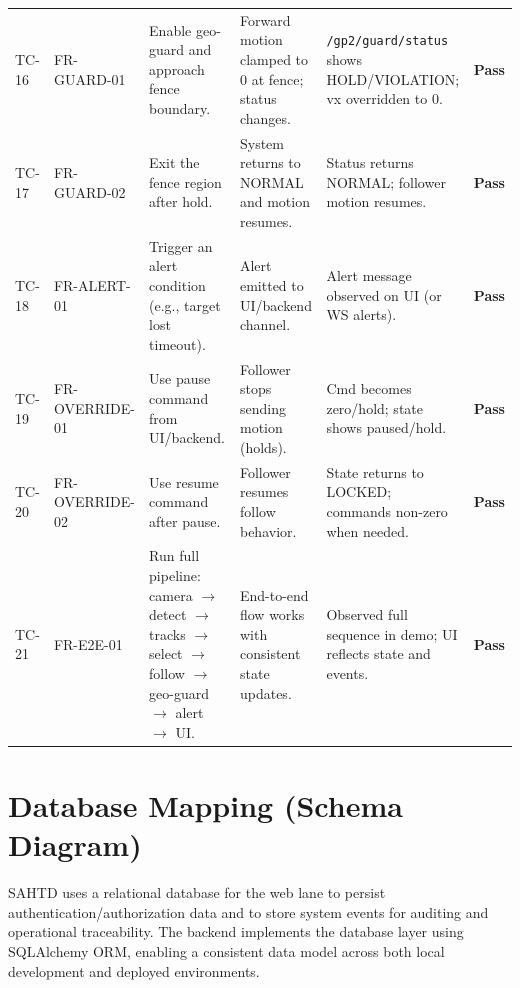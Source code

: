 \documentclass[12pt,a4paper]{report}
\newcommand{\statusPass}{\textcolor{green!45!black}{\textbf{Pass}}}
\begin{document}
\begin{landscape}
\begin{longtable}{@{}L{1.6cm} L{2.6cm} L{5.2cm} L{5.2cm} L{5.2cm} C{1.4cm}@{}}
TC-16 & FR-GUARD-01 &
Enable geo-guard and approach fence boundary. &
Forward motion clamped to 0 at fence; status changes. &
\texttt{/gp2/guard/status} shows HOLD/VIOLATION; vx overridden to 0. &
\statusPass \\

TC-17 & FR-GUARD-02 &
Exit the fence region after hold. &
System returns to NORMAL and motion resumes. &
Status returns NORMAL; follower motion resumes. &
\statusPass \\

TC-18 & FR-ALERT-01 &
Trigger an alert condition (e.g., target lost timeout). &
Alert emitted to UI/backend channel. &
Alert message observed on UI (or WS alerts). &
\statusPass \\

TC-19 & FR-OVERRIDE-01 &
Use pause command from UI/backend. &
Follower stops sending motion (holds). &
Cmd becomes zero/hold; state shows paused/hold. &
\statusPass \\

TC-20 & FR-OVERRIDE-02 &
Use resume command after pause. &
Follower resumes follow behavior. &
State returns to LOCKED; commands non-zero when needed. &
\statusPass \\

TC-21 & FR-E2E-01 &
Run full pipeline: camera $\rightarrow$ detect $\rightarrow$ tracks $\rightarrow$ select $\rightarrow$ follow $\rightarrow$ geo-guard $\rightarrow$ alert $\rightarrow$ UI. &
End-to-end flow works with consistent state updates. &
Observed full sequence in demo; UI reflects state and events. &
\statusPass \\

\end{longtable}

\endgroup
\end{landscape}

\section{Database Mapping (Schema Diagram)}
SAHTD uses a relational database for the web lane to persist authentication/authorization data and to store system events for auditing and operational traceability. The backend implements the database layer using SQLAlchemy \ac{ORM}, enabling a consistent data model across both local development and deployed environments.
\end{document}
